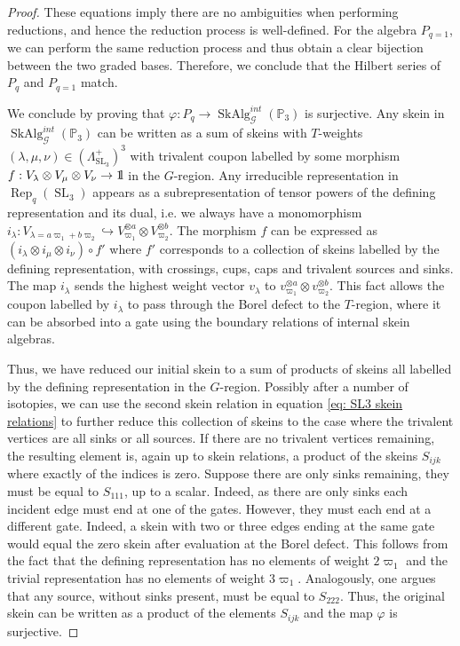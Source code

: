 \documentclass[a4paper]{article}
\numberwithin{equation}{section}
\newcommand{\1}{{\mathrm{1}\mkern-4mu{\mathchoice{}{}{\mskip-0.5mu}{\mskip-1mu}}\mathrm{l}}}
\newcommand{\PP}{\mathbb{P}}
\DeclareMathOperator{\Rep}{Rep}
\DeclareMathOperator{\SL}{SL}
\DeclareMathOperator{\SkAlg}{SkAlg}
\begin{document}
\begin{proof}
These equations imply there are no ambiguities when performing reductions, and hence the reduction process is well-defined. For the algebra $P_{q=1}$, we can perform the same reduction process and thus obtain a clear bijection between the two graded bases. Therefore, we conclude that the Hilbert series of $P_q$ and $P_{q=1}$ match.

We conclude by proving that $\varphi: P_q \to \SkAlg^{int}_\mathcal{G}(\PP_3)$ is surjective. 
Any skein in $\SkAlg^{int}_\mathcal{G}(\PP_3)$ can be written as a sum of skeins with $T$-weights $(\lambda,\mu,\nu) \in (\Lambda^+_{\SL_{3}})^3$ with trivalent coupon labelled by some morphism  $f:V_\lambda \otimes V_{\mu} \otimes V_{\nu} \to \1$ in the $G$-region.
Any irreducible representation in $\Rep_q(\SL_3)$ appears as a subrepresentation of tensor powers of the defining representation and its dual, i.e. we always have a monomorphism $i_\lambda:V_{\lambda =a\varpi_1 + b\varpi_2} \hookrightarrow V_{\varpi_1}^{\otimes a} \otimes V_{\varpi_2}^{\otimes b}$.
The morphism $f$ can be expressed as $(i_\lambda \otimes i_\mu \otimes i_\nu) \circ f'$ where $f'$ corresponds to a collection of skeins labelled by the defining representation, with crossings, cups, caps and trivalent sources and sinks. The map $i_\lambda$ sends the highest weight vector $v_\lambda$ to $v_{\varpi_1}^{\otimes a} \otimes v_{\varpi_2}^{\otimes b}$.
This fact allows the coupon labelled by $i_\lambda$ to pass through the Borel defect to the $T$-region, where it can be absorbed into a gate using the boundary relations of internal skein algebras.

Thus, we have reduced our initial skein to a sum of products of skeins all labelled by the defining representation in the $G$-region.
Possibly after a number of isotopies, we can use the second skein relation in equation \eqref{eq: SL3 skein relations} to further reduce this collection of skeins to the case where the trivalent vertices are all sinks or all sources. If there are no trivalent vertices remaining, the resulting element is, again up to skein relations, a product of the skeins $S_{ijk}$ where exactly of the indices is zero. Suppose there are only sinks remaining, they must be equal to $S_{111}$, up to a scalar. Indeed, as there are only sinks each incident edge must end at one of the gates. However, they must each end at a different gate. Indeed, a skein with two or three edges ending at the same gate would equal the zero skein after evaluation at the Borel defect. This follows from the fact that the defining representation has no elements of weight $2\varpi_1$ and the trivial representation has no elements of weight $3\varpi_1$.
Analogously, one argues that any source, without sinks present, must be equal to $S_{222}$. Thus, the original skein can be written as a product of the elements $S_{ijk}$ and the map $\varphi$ is surjective.


\end{proof}
\end{document}
